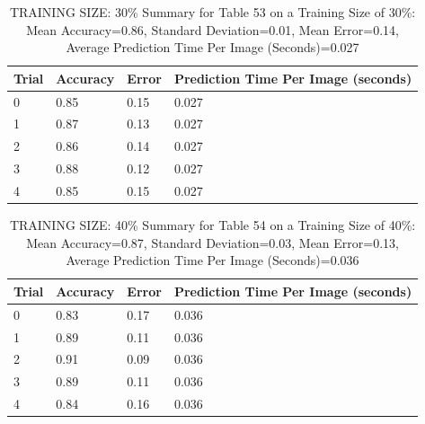 \documentclass{article}
\begin{document}
\begin{table}[H]

\centering
{\begin{tabular}{||p{1cm}|p{1.8cm}|p{1.8cm}|p{3cm}||}
 \hline
Trial & Accuracy & Error & Prediction Time Per Image (seconds) \\ [0.5ex] 
 \hline\hline
   0  & 0.85  & 0.15  & 0.027\\
\hline
   1  & 0.87  & 0.13  & 0.027\\
\hline
   2  & 0.86  & 0.14  & 0.027\\
\hline
   3  & 0.88  & 0.12  & 0.027\\
\hline
   4  & 0.85  & 0.15  & 0.027\\
\hline

\end{tabular}}
\caption{TRAINING SIZE: 30\% \newline Summary for Table 53 on a Training Size of 30\%: Mean Accuracy=0.86, Standard Deviation=0.01, Mean Error=0.14, Average Prediction Time Per Image (Seconds)=0.027}
\end{table} 

\begin{table}[H]

\centering
{\begin{tabular}{||p{1cm}|p{1.8cm}|p{1.8cm}|p{3cm}||}
 \hline
Trial & Accuracy & Error & Prediction Time Per Image (seconds) \\ [0.5ex] 
 \hline\hline
   0  & 0.83  & 0.17  & 0.036\\
\hline
   1  & 0.89  & 0.11  & 0.036\\
\hline
   2  & 0.91  & 0.09  & 0.036\\
\hline
   3  & 0.89  & 0.11  & 0.036\\
\hline
   4  & 0.84  & 0.16  & 0.036\\
\hline

\end{tabular}}
\caption{TRAINING SIZE: 40\% \newline Summary for Table 54 on a Training Size of 40\%: Mean Accuracy=0.87, Standard Deviation=0.03, Mean Error=0.13, Average Prediction Time Per Image (Seconds)=0.036}
\end{table} 
\end{document}
